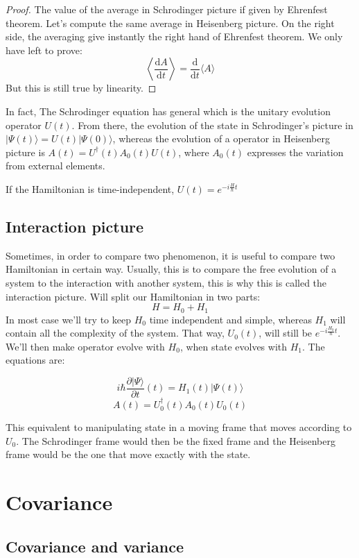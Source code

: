 \documentclass[10pt]{report}
\theoremstyle{plain}
\theoremstyle{definition}
\theoremstyle{remark}
\newcommand{\ket}[1]{|#1\rangle}
\newcommand{\dd}{\mathrm{d}}
\newcommand{\der}[2]{\frac{\dd{#1}}{\dd{#2}}}
\begin{document}
\begin{proof}
  The value of the average in Schrodinger picture if given by Ehrenfest theorem.
  Let's compute the same average in Heisenberg picture. On the right side, the
  averaging give instantly the right hand of Ehrenfest theorem. We only have
  left to prove:
  \[ \left \langle \der A t\right\rangle = \der{}t\langle A\rangle\]
  But this is still true by linearity.
\end{proof}

In fact, The Schrodinger equation has general which is the unitary evolution
operator $U(t)$. From there, the evolution of the state in Schrodinger's picture
in $\ket {\Psi(t)} = U(t) \ket {\Psi(0)}$, whereas the evolution of a operator
in Heisenberg picture is $A(t) = U^\dagger(t)A_0(t)U(t)$, where $A_0(t)$
expresses the variation from external elements.

If the Hamiltonian is time-independent, $U(t) = e^{-i\frac H\hbar t}$

\section{Interaction picture}

Sometimes, in order to compare two phenomenon, it is useful to compare two
Hamiltonian in certain way. Usually, this is to compare the free evolution of a
system to the interaction with another system, this is why this is called the
interaction picture. Will split our Hamiltonian in two parts:
\[H = H_0 + H_1\]
In most case we'll try to keep $H_0$ time independent and simple, whereas $H_1$
will contain all the complexity of the system. That way, $U_0(t)$, will still be
$e^{-i\frac {H_0}\hbar t}$. We'll then make operator evolve with $H_0$, when
state evolves with $H_1$. The equations are:

\[i\hbar \frac{\partial \ket \Psi}{\partial t} (t) = H_1(t) \ket {\Psi(t)} \]
\[A(t) = U_0^\dagger(t)A_0(t)U_0(t)\]

This equivalent to manipulating state in a moving frame that moves according to
$U_0$. The Schrodinger frame would then be the fixed frame and the Heisenberg frame
would be the one that move exactly with the state.

\chapter{Covariance}\label{app:cov}

\section{Covariance and variance}
\end{document}
